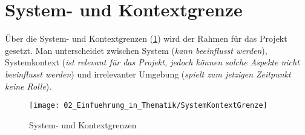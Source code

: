 \section{System- und Kontextgrenze} \label{SystemKontextGrenze}

Über die System- und Kontextgrenzen (\ref{fig:SystemKontextGrenze}) wird der Rahmen für das Projekt gesetzt. Man unterscheidet zwischen System (\textit{kann beeinflusst werden}), Systemkontext (\textit{ist relevant für das Projekt, jedoch können solche Aspekte nicht beeinflusst werden}) und irrelevanter Umgebung (\textit{spielt zum jetzigen Zeitpunkt keine Rolle}).

\begin{figure}[h!]
	\centering
	\texttt{[image: 02\_Einfuehrung\_in\_Thematik/SystemKontextGrenze]}
	\captionsetup{justification=centering}
	\caption{System- und Kontextgrenzen}
	\label{fig:SystemKontextGrenze}
\end{figure}

\newpage